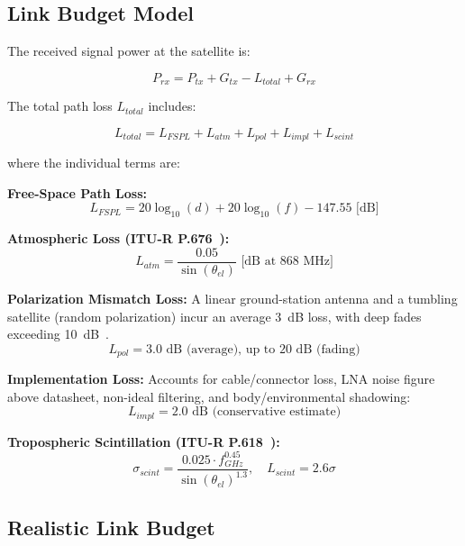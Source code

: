 \documentclass[11pt,a4paper]{article}
\begin{document}
\subsection{Link Budget Model}

The received signal power at the satellite is:

\begin{equation}
P_{rx} = P_{tx} + G_{tx} - L_{total} + G_{rx}
\end{equation}

The total path loss $L_{total}$ includes:

\begin{equation}
L_{total} = L_{FSPL} + L_{atm} + L_{pol} + L_{impl} + L_{scint}
\end{equation}

where the individual terms are:

\textbf{Free-Space Path Loss:}
\begin{equation}
L_{FSPL} = 20\log_{10}(d) + 20\log_{10}(f) - 147.55 \text{ [dB]}
\end{equation}

\textbf{Atmospheric Loss (ITU-R P.676~\cite{itur_p676}):}
\begin{equation}
L_{atm} = \frac{0.05}{\sin(\theta_{el})} \text{ [dB at 868~MHz]}
\end{equation}

\textbf{Polarization Mismatch Loss:}
A linear ground-station antenna and a tumbling satellite (random polarization) incur an average 3~dB loss, with deep fades exceeding 10~dB~\cite{fernandez2020}.
\begin{equation}
L_{pol} = 3.0 \text{ dB (average), up to 20~dB (fading)}
\end{equation}

\textbf{Implementation Loss:}
Accounts for cable/connector loss, LNA noise figure above datasheet, non-ideal filtering, and body/environmental shadowing:
\begin{equation}
L_{impl} = 2.0 \text{ dB (conservative estimate)}
\end{equation}

\textbf{Tropospheric Scintillation (ITU-R P.618~\cite{itur_p618}):}
\begin{equation}
\sigma_{scint} = \frac{0.025 \cdot f_{GHz}^{0.45}}{\sin(\theta_{el})^{1.3}}, \quad L_{scint} = 2.6\sigma
\end{equation}

\subsection{Realistic Link Budget}
\end{document}
